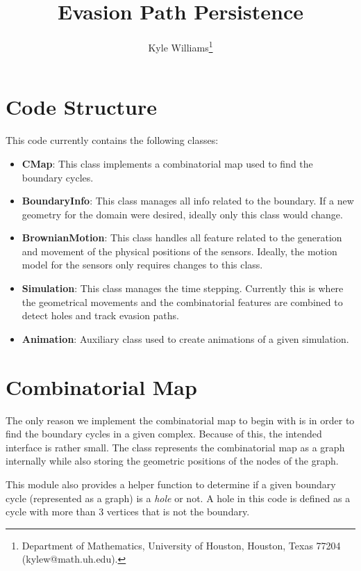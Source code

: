 \documentclass[12pt]{article}
\title{Evasion Path Persistence }
\author{
	Kyle Williams\thanks{Department of Mathematics, University of Houston, Houston, Texas 77204 (kylew@math.uh.edu).}
}
\begin{document}
	
\maketitle

\tableofcontents
\vfill
\clearpage
\let\oldtabular\tabular
\renewcommand{\tabular}[1][1.5]{\def\arraystretch{#1}\oldtabular}
\renewcommand\arraystretch{1.3}

\section{Code Structure}

This code currently contains the following classes:
\begin{itemize}
	\item {\bf CMap}: This class implements a combinatorial map used to find the boundary cycles.
	\item {\bf BoundaryInfo}: This class manages all info related to the boundary. If a new geometry for the domain were desired, ideally only this class would change.
	\item {\bf BrownianMotion}: This class handles all feature related to the generation and movement of the physical positions of the sensors. Ideally, the motion model for the sensors only requires changes to this class.
	\item {\bf Simulation}: This class manages the time stepping. Currently this is where the geometrical movements and the combinatorial features are combined to detect holes and track evasion paths.
	\item {\bf Animation}: Auxiliary class used to create animations of a given simulation.
\end{itemize}

\section{Combinatorial Map}
The only reason we implement the combinatorial map to begin with is in order to find the boundary cycles in a given complex. Because of this, the intended interface is rather small. The class represents the combinatorial map as a graph internally while also storing the geometric positions of the nodes of the graph.

 This module also provides a helper function to determine if a given boundary cycle (represented as a graph) is a {\it hole} or not. A hole in this code is defined as a cycle with more than 3 vertices that is not the boundary.
\end{document}
